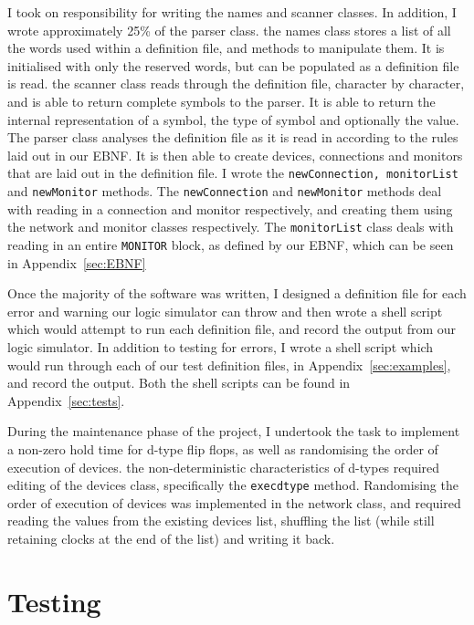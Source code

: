 \documentclass[a4paper,10pt]{article}
\begin{document}
I took on responsibility for writing the names and scanner classes. In addition, I wrote approximately 25\% of the parser class. the names class stores a list of all the words used within a definition file, and methods to manipulate them. It is initialised with only the reserved words, but can be populated as a definition file is read. the scanner class reads through the definition file, character by character, and is able to return complete symbols to the parser. It is able to return the internal representation of a symbol, the type of symbol and optionally the value. The parser class analyses the definition file as it is read in according to the rules laid out in our EBNF. It is then able to create devices, connections and monitors that are laid out in the definition file. I wrote the \texttt{newConnection, monitorList} and \texttt{newMonitor} methods. The \texttt{newConnection} and \texttt{newMonitor} methods deal with reading in a connection and monitor respectively, and creating them using the network and monitor classes respectively. The \texttt{monitorList} class deals with reading in an entire \texttt{MONITOR} block, as defined by our EBNF, which can be seen in Appendix~\ref{sec:EBNF}

Once the majority of the software was written, I designed a definition file for each error and warning our logic simulator can throw and then wrote a shell script which would attempt to run each definition file, and record the output from our logic simulator. In addition to testing for errors, I wrote a shell script which would run through each of our test definition files, in Appendix~\ref{sec:examples}, and record the output. Both the shell scripts can be found in Appendix~\ref{sec:tests}.

During the maintenance phase of the project, I undertook the task to implement a non-zero hold time for d-type flip flops, as well as randomising the order of execution of devices. the non-deterministic characteristics of d-types required editing of the devices class, specifically the \texttt{execdtype} method. Randomising the order of execution of devices was implemented in the network class, and required reading the values from the existing devices list, shuffling the list (while still retaining clocks at the end of the list) and writing it back.

\section{Testing}
\end{document}
